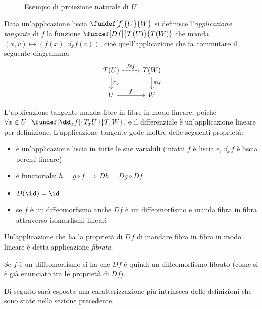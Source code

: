 \begin{figure}
\centering

\caption{Esempio di proiezione naturale di $U$}
\end{figure}

\begin{defn}
Data un'applicazione liscia $\fundef[f]{U}{W}$ si definisce l'\emph{applicazione tangente} di $f$ la funzione $\fundef[Df]{T(U)}{T(W)}$ che manda $(x,v) \mapsto (f(x), \dd_xf(v))$, cioè quell'applicazione che fa commutare il seguente diagramma:
\begin{equation*}
\begin{tikzcd}
	T(U) \arrow[r, dashrightarrow, "Df"] \arrow[d, "\pi_U"]
		& T(W) \arrow[d, "\pi_W"] \\
	U \arrow[r, "f"]
		& W
\end{tikzcd}
\end{equation*}
\end{defn}

\begin{oss}
L'applicazione tangente manda fibre in fibre in modo lineare, poiché $\forall x\in U\ \ \fundef[\dd_xf]{T_x U}{T_x W}$, e il differenziale è un'applicazione lineare per definizione.
L'applicazione tangente gode inoltre delle seguenti proprietà:
\begin{itemize}
\item è un'applicazione liscia in tutte le sue variabili (infatti $f$ è liscia e, $\dd_xf$ è liscia perché lineare)
\item è functoriale: $h = g\circ f \implies Dh = Dg\circ Df$
\item $D(\id) = \id$
\item se $f$ è un diffeomorfismo anche $Df$ è un diffeomorfismo e manda fibra in fibra attraverso isomorfismi lineari
\end{itemize}
\end{oss}

\begin{defn}
Un'applicazione che ha la proprietà di $Df$ di mandare fibra in fibra in modo lineare è detta applicazione \emph{fibrata}.
\end{defn}

Se $f$ è un diffeomorfismo si ha che $Df$ è quindi un diffeomorfismo fibrato (come si è già enunciato tra le proprietà di $Df$).


Di seguito sarà esposta una caratterizzazione più intrinseca delle definizioni che sono state nella sezione precedente.

